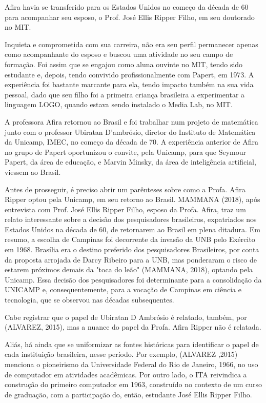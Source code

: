 Afira havia se transferido para os Estados Unidos no começo da década de 60 para acompanhar seu esposo, o Prof. José Ellis Ripper Filho, em seu doutorado no MIT.

Inquieta e comprometida com sua carreira, não era seu perfil permanecer apenas como acompanhante do esposo e buscou uma atividade no seu campo de formação. Foi assim que se engajou como aluna ouvinte no MIT, tendo sido estudante e, depois, tendo convivido profissionalmente com Papert, em 1973. A experiência foi bastante marcante para ela, tendo impacto também na sua vida pessoal, dado que seu filho foi a primeira criança brasileira a experimentar a linguagem LOGO, quando estava sendo instalado o Media Lab, no MIT.

A professora Afira retornou ao Brasil e foi trabalhar num projeto de matemática junto com o professor Ubiratan D’ambrósio, diretor do Instituto de Matemática da Unicamp, IMEC, no começo da década de 70. A experiência anterior de Afira no grupo de Papert oportunizou o convite, pela Unicamp, para que Seymour Papert, da área de educação, e Marvin Minsky, da área de inteligência artificial, viessem ao Brasil.

Antes de prosseguir, é preciso abrir um parênteses sobre como a Profa. Afira Ripper optou pela Unicamp, em seu retorno ao Brasil.  MAMMANA (2018), após entrevista com Prof. José Ellis Ripper Filho, esposo da Profa. Afira, traz um relato interessante sobre a decisão dos pesquisadores brasileiros, expatriados nos Estados Unidos na década de 60, de retornarem ao Brasil em plena ditadura. Em resumo, a escolha de Campinas foi decorrente da invasão da UNB pelo Exército em 1968. Brasília era o destino preferido dos pesquisadores Brasileiros, por conta da proposta arrojada de Darcy Ribeiro para a UNB, mas ponderaram o risco de estarem próximos demais da "toca do leão"  (MAMMANA, 2018), optando pela Unicamp. Essa decisão dos pesquisadores foi determinante para a consolidação da UNICAMP e, consequentemente, para a vocação de Campinas em ciência e tecnologia, que se observou nas décadas subsequentes.

Cabe registrar que o papel de Ubiratan D Ambrósio é relatado, também, por (ALVAREZ, 2015), mas a nuance do papel da Profa. Afira Ripper não é relatada.

Aliás, há ainda que se uniformizar as fontes históricas para identificar o papel de cada instituição brasileira, nesse período. Por exemplo, (ALVAREZ ,2015) menciona o pioneirismo da Universidade Federal do Rio de Janeiro, 1966, no uso de computador em atividades acadêmicas. Por outro lado, o ITA reivindica a construção do primeiro computador em 1963, construído no contexto de um curso de graduação, com a participação do, então, estudante José Ellis Ripper Filho.

